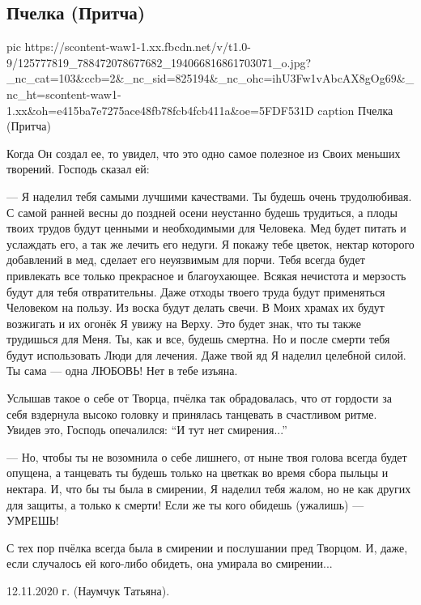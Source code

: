  
 
 

\subsection{Пчелка (Притча)}
\label{sec:16_11_2020.fb.tanya_naumchuk.1.pchelka_pritcha}

\ifcmt
pic https://scontent-waw1-1.xx.fbcdn.net/v/t1.0-9/125777819_788472078677682_194066816861703071_o.jpg?_nc_cat=103&ccb=2&_nc_sid=825194&_nc_ohc=ihU3Fw1vAbcAX8gOg69&_nc_ht=scontent-waw1-1.xx&oh=e415ba7e7275ace48fb78fcb4fcb411a&oe=5FDF531D
caption Пчелка (Притча)
\fi

Когда Он создал ее, то увидел, что это одно самое полезное из Своих меньших творений. Господь сказал ей:

--- Я наделил тебя самыми лучшими качествами. Ты будешь очень трудолюбивая. С
самой ранней весны до поздней осени неустанно будешь трудиться, а плоды твоих
трудов будут ценными и необходимыми для Человека. Мед будет питать и
услаждать его, а так же лечить его недуги. Я покажу тебе цветок, нектар
которого добавлений в мед, сделает его неуязвимым для порчи. Тебя всегда
будет привлекать все только прекрасное и благоухающее. Всякая нечистота и
мерзость будут для  тебя отвратительны. Даже отходы твоего труда будут
применяться Человеком на пользу. Из воска будут делать свечи. В Моих храмах
их будут возжигать и их огонёк Я увижу на Верху. Это будет знак, что ты также
трудишься для Меня. Ты, как и все, будешь смертна. Но и после смерти тебя
будут использовать Люди для лечения. Даже твой яд Я наделил целебной силой.
Ты сама --- одна ЛЮБОВЬ! Нет в тебе изъяна.

Услышав такое о себе от Творца, пчёлка так обрадовалась, что  от гордости
за себя вздернула высоко головку и принялась танцевать в счастливом ритме.
Увидев это, Господь опечалился: \enquote{И тут нет смирения...}

--- Но, чтобы ты не возомнила о себе лишнего, от ныне твоя голова всегда будет
опущена, а танцевать ты будешь только на цветкак во время сбора пыльцы и
нектара. И, что бы ты была в смирении, Я наделил тебя жалом, но не как других
для защиты, а только к смерти! Если же ты кого обидешь (ужалишь) --- УМРЕШЬ!

С тех пор пчёлка всегда была в смирении и послушании пред Творцом. И, даже,
если случалось ей кого-либо обидеть, она умирала во смирении...

12.11.2020 г. (Наумчук Татьяна).
